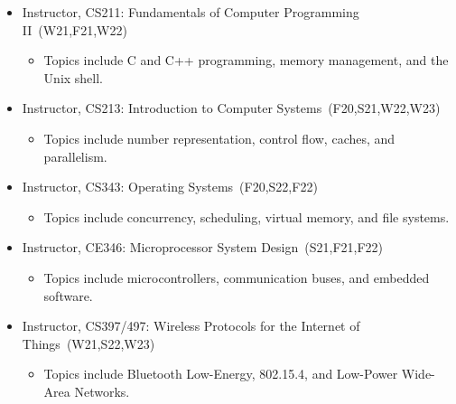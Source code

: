 \documentclass{article}
\begin{document}
\begin{itemize}
  \item[] Instructor, CS211: Fundamentals of Computer Programming II~(W21,F21,W22)
    \vspace{-\topsep}
    \vspace{\itemsep}
    \begin{itemize}
      \item Topics include C and C++ programming, memory management, and the Unix shell.
    \end{itemize}
  \item[] Instructor, CS213: Introduction to Computer Systems~(F20,S21,W22,W23)
    \vspace{-\topsep}
    \vspace{\itemsep}
    \begin{itemize}
      \item Topics include number representation, control flow, caches, and parallelism.
    \end{itemize}
  \item[] Instructor, CS343: Operating Systems~(F20,S22,F22)
    \vspace{-\topsep}
    \vspace{\itemsep}
    \begin{itemize}
      \item Topics include concurrency, scheduling, virtual memory, and file systems.
    \end{itemize}
  \item[] Instructor, CE346: Microprocessor System Design~(S21,F21,F22)
    \vspace{-\topsep}
    \vspace{\itemsep}
    \begin{itemize}
      \item Topics include microcontrollers, communication buses, and embedded software.
    \end{itemize}
  \item[] Instructor, CS397/497: Wireless Protocols for the Internet of Things~(W21,S22,W23)
    \vspace{-\topsep}
    \vspace{\itemsep}
    \begin{itemize}
      \item Topics include Bluetooth Low-Energy, 802.15.4, and Low-Power Wide-Area Networks.
    \end{itemize}
\end{itemize}

\newpage
\end{document}
